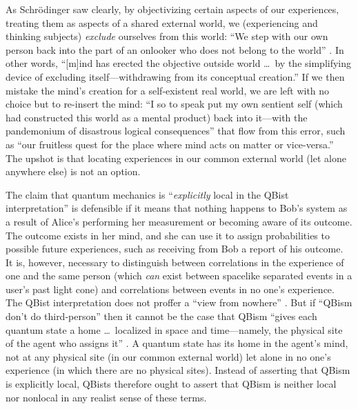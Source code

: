 \documentclass[12pt]{article}
\begin{document}
As Schr\"odinger saw clearly, by objectivizing certain aspects of our experiences, treating them as aspects of a shared {external world}, we (experiencing and thinking subjects) \emph{exclude} ourselves from this world: ``We step with our own person back into the part of an onlooker who does not belong to the world'' \cite{SchrLifeMindMatter3}. In other words, ``[m]ind has erected the objective outside world \dots\ by the simplifying device of excluding itself---withdrawing from its conceptual creation.'' If we then mistake the mind's creation for a self-existent real world, we are left with no choice but to re-insert the mind: ``I so to speak put my own sentient self (which had constructed this world as a mental product) back into it---with the {pandemonium} of disastrous logical consequences'' that flow from this error, such as ``our fruitless quest for the place where mind acts on matter or vice-versa.'' The upshot is that locating experiences in our common external world (let alone anywhere else) is not an option.

The claim that quantum mechanics is ``\emph{explicitly} local in the QBist inter\-pretation''\cite{FMS2014} is defensible if it means that nothing happens to Bob's system as a result of Alice's performing her measurement or becoming aware of its outcome. The outcome exists in her mind, and she can use it to assign probabilities to possible future experiences, such as receiving from Bob a report of his outcome. It is, however, necessary to distinguish between correlations in the experience of one and the same person (which \emph{can} exist between spacelike separated events in a user's past light cone) and correlations between events in no one's experience. The QBist interpretation does not proffer a ``{view from nowhere}'' \cite{Nagel_Nowhere}. But if ``QBism don't do third-person''\cite{Fuchs_Notwithstanding} then it cannot be the case that QBism ``gives each {quantum state} a home \dots\ localized in space and time---namely, the physical site of the agent who assigns it'' \cite{Fuchs_Perimeter}. A quantum state has its home in the agent's mind, not at any physical site (in our common external world) let alone in no one's experience (in which there are no physical sites). Instead of asserting that QBism is explicitly local, QBists therefore ought to assert that QBism is neither local nor nonlocal in any realist sense of these terms.
\end{document}
